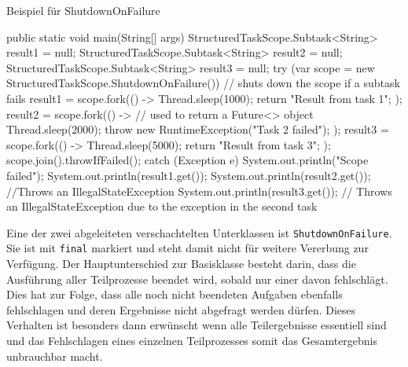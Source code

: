     \begin{program} [H]
        \caption{Beispiel für ShutdownOnFailure}
        \label{prog:BeispielFürShutdownOnFailure}
    \begin{JavaCode}[language=Java, numbers=left]
public static void main(String[] args) {
    StructuredTaskScope.Subtask<String> result1 = null;
    StructuredTaskScope.Subtask<String> result2 = null;
    StructuredTaskScope.Subtask<String> result3 = null;
    try (var scope = new StructuredTaskScope.ShutdownOnFailure()) {            // shuts down the scope if a subtask fails
        result1 = scope.fork(() -> {
            Thread.sleep(1000);
            return "Result from task 1";
        });
        result2 = scope.fork(() -> {         // used to return a Future<> object
            Thread.sleep(2000);
            throw new RuntimeException("Task 2 failed");
        });
        result3 = scope.fork(() -> {
            Thread.sleep(5000);
            return "Result from task 3";
        });
        scope.join().throwIfFailed();
    } catch (Exception e) {
        System.out.println("Scope failed");
    }
    System.out.println(result1.get());                                          
    System.out.println(result2.get());         //Throws an IllegalStateException
    System.out.println(result3.get());        // Throws an IllegalStateException due to the exception in the second task
}\end{JavaCode}
    \end{program}
    Eine der zwei abgeleiteten verschachtelten Unterklassen ist \texttt{ShutdownOnFailure}. Sie ist mit \texttt{final} markiert und steht damit nicht für weitere
    Vererbung zur Verfügung. Der Hauptunterschied zur Basisklasse besteht darin, dass die Ausführung aller Teilprozesse beendet wird, sobald nur einer davon fehlschlägt.
    Dies hat zur Folge, dass alle noch nicht beendeten Aufgaben ebenfalls fehlschlagen und deren Ergebnisse nicht abgefragt werden dürfen. Dieses Verhalten ist besonders dann
    erwünscht wenn alle Teilergebnisse essentiell sind und das Fehlschlagen eines einzelnen Teilprozesses somit das Gesamtergebnis unbrauchbar macht. 

